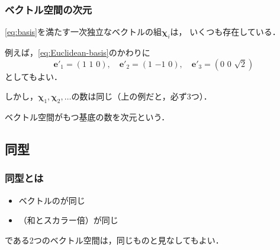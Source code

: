 \documentclass[
    10pt,
    ]{sotsu-beamer}
\begin{document}
\begin{frame}
    \frametitle{ベクトル空間の次元}

    \eqref{eq:basis}を満たす一次独立なベクトルの組$\symbf{\chi}_i$は，
    いくつも存在している．

    例えば，\eqref{eq:Euclidean-basis}のかわりに
    \begin{equation*}
        \symbf{e}'_1 = (1 \,\, 1 \,\, 0), \quad 
        \symbf{e}'_2 = (1 \,\, {-1} \,\, 0), \quad
        \symbf{e}'_3 = (0 \,\, 0 \,\, \sqrt{2})
    \end{equation*}
    としてもよい．

    しかし，$\symbf{\chi}_1, \symbf{\chi}_2, \dotsc$の数は同じ（上の例だと，必ず3つ）．

    ベクトル空間がもつ基底の数を\alert{次元}という．


\end{frame}


\subsection{同型}


\begin{frame}
    \frametitle{同型とは}

    \begin{itemize}
        \item ベクトルのが同じ
        \item {}（和とスカラー倍）が同じ
    \end{itemize}
    である2つのベクトル空間は，同じものと見なしてもよい．
    
\end{frame}
\end{document}
